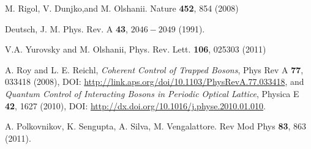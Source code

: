 \documentclass[a4paper,10pt]{report}
\begin{document}
\begin{thebibliography}{10}
\newblock M. Rigol, V. Dunjko,and M. Olshanii.
\newblock Nature {\bf 452}, 854 (2008)

\newblock Deutsch, J. M. 
\newblock Phys. Rev. A {\bf 43}, $2046-2049$ (1991).

\newblock V.A. Yurovsky and M. Olshanii,
\newblock  Phys. Rev. Lett. {\bf 106}, 025303 (2011) 

\newblock A. Roy and L. E. Reichl,
\newblock \textit{Coherent Control of Trapped Bosons},
\newblock Phys Rev A {\bf 77}, 033418 (2008),
\newblock DOI: \url{http://link.aps.org/doi/10.1103/PhysRevA.77.033418}, and
\newblock \textit{Quantum Control of Interacting Bosons in Periodic Optical Lattice}, 
\newblock Physica E {\bf 42}, 1627 (2010),
\newblock DOI: \url{http://dx.doi.org/10.1016/j.physe.2010.01.010}. 

\newblock A. Polkovnikov, K. Sengupta, A. Silva, M. Vengalattore.
\newblock Rev Mod Phys {\bf 83}, 863 (2011).
\end{thebibliography}
\end{document}
